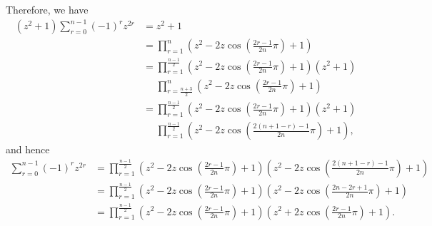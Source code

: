 \begin{enumerate}
          Therefore, we have
          \begin{align*}
              (z^2 + 1) \sum_{r = 0}^{n - 1} (-1)^r z^{2r} & = z^2 + 1                                                                                                                \\
                                                           & = \prod_{r = 1}^{n} \left(z^2 - 2z \cos \left(\frac{2r - 1}{2n} \pi\right) + 1\right)                                    \\
                                                           & = \prod_{r = 1}^{\frac{n - 1}{2}} \left(z^2 - 2z \cos \left(\frac{2r - 1}{2n} \pi\right) + 1\right) (z^2 + 1)            \\
                                                           & \phantom{=} \prod_{r = \frac{n + 3}{2}}^{n} \left(z^2 - 2z \cos \left(\frac{2r - 1}{2n} \pi\right) + 1\right)            \\
                                                           & = \prod_{r = 1}^{\frac{n - 1}{2}} \left(z^2 - 2z \cos \left(\frac{2r - 1}{2n} \pi\right) + 1\right) (z^2 + 1)            \\
                                                           & \phantom{=} \prod_{r = 1}^{\frac{n - 1}{2}} \left(z^2 - 2z \cos \left(\frac{2(n + 1 - r) - 1}{2n} \pi\right) + 1\right),
          \end{align*}
          and hence
          \begin{align*}
              \sum_{r = 0}^{n - 1} (-1)^r z^{2r} & = \prod_{r = 1}^{\frac{n - 1}{2}} \left(z^2 - 2z \cos \left(\frac{2r - 1}{2n} \pi\right) + 1\right) \left(z^2 - 2z \cos \left(\frac{2(n + 1 - r) - 1}{2n} \pi\right) + 1\right) \\
                                                 & = \prod_{r = 1}^{\frac{n - 1}{2}} \left(z^2 - 2z \cos \left(\frac{2r - 1}{2n} \pi\right) + 1\right) \left(z^2 - 2z \cos \left(\frac{2n - 2r + 1}{2n} \pi\right) + 1\right)      \\
                                                 & = \prod_{r = 1}^{\frac{n - 1}{2}} \left(z^2 - 2z \cos \left(\frac{2r - 1}{2n} \pi\right) + 1\right) \left(z^2 + 2z \cos \left(\frac{2r - 1}{2n} \pi\right) + 1\right).
          \end{align*}


\end{enumerate}
